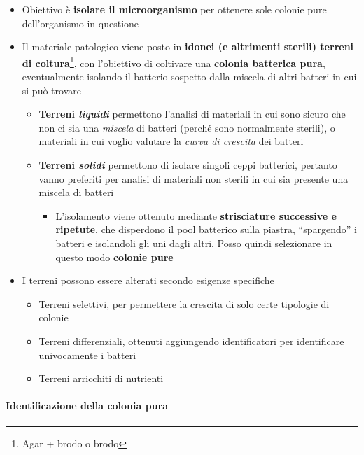 \documentclass[italian,]{article}
\providecommand{\tightlist}{%
  \setlength{\itemsep}{0pt}\setlength{\parskip}{0pt}}
\begin{document}
\begin{itemize}
\tightlist
\item
  Obiettivo è \textbf{isolare il microorganismo} per ottenere sole
  colonie pure dell'organismo in questione
\item
  Il materiale patologico viene posto in \textbf{idonei (e altrimenti
  sterili) terreni di coltura}\footnote{Agar + brodo o brodo}, con
  l'obiettivo di coltivare una \textbf{colonia batterica pura},
  eventualmente isolando il batterio sospetto dalla miscela di altri
  batteri in cui si può trovare

  \begin{itemize}
  \tightlist
  \item
    \textbf{Terreni \emph{liquidi} } permettono l'analisi di materiali
    in cui sono sicuro che non ci sia una \emph{miscela} di batteri
    (perché sono normalmente sterili), o materiali in cui voglio
    valutare la \emph{curva di crescita} dei batteri
  \item
    \textbf{Terreni \emph{solidi} } permettono di isolare singoli ceppi
    batterici, pertanto vanno preferiti per analisi di materiali non
    sterili in cui sia presente una miscela di batteri

    \begin{itemize}
    \tightlist
    \item
      L'isolamento viene ottenuto mediante \textbf{strisciature
      successive e ripetute}, che disperdono il pool batterico sulla
      piastra, ``spargendo'' i batteri e isolandoli gli uni dagli altri.
      Posso quindi selezionare in questo modo \textbf{colonie pure}
    \end{itemize}
  \end{itemize}
\item
  I terreni possono essere alterati secondo esigenze specifiche

  \begin{itemize}
  \tightlist
  \item
    Terreni selettivi, per permettere la crescita di solo certe
    tipologie di colonie
  \item
    Terreni differenziali, ottenuti aggiungendo identificatori per
    identificare univocamente i batteri
  \item
    Terreni arricchiti di nutrienti
  \end{itemize}
\end{itemize}

\hypertarget{identificazione-della-colonia-pura}{%
\paragraph{Identificazione della colonia
pura}\label{identificazione-della-colonia-pura}}
\end{document}
